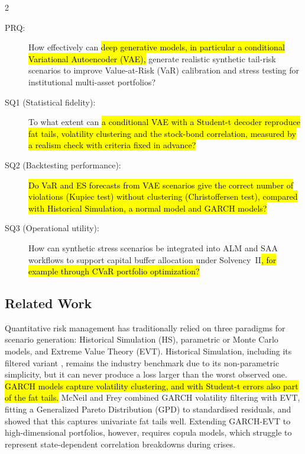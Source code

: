 \documentclass[12pt]{spieman}  %
\newcommand{\new}[1]{\hl{#1}}
\begin{document}
\begin{spacing}{2}
\begin{description}
\item[PRQ:] How effectively can \new{deep generative models, in particular a conditional Variational Autoencoder (VAE),} generate realistic synthetic tail-risk scenarios to improve Value-at-Risk (VaR) calibration and stress testing for institutional multi-asset portfolios?
\item[SQ1 (Statistical fidelity):] To what extent can \new{a conditional VAE with a Student-t decoder reproduce fat tails, volatility clustering and the stock-bond correlation, measured by a realism check with criteria fixed in advance?}
\item[SQ2 (Backtesting performance):] \new{Do VaR and ES forecasts from VAE scenarios give the correct number of violations (Kupiec test) without clustering (Christoffersen test), compared with Historical Simulation, a normal model and GARCH models?}
\item[SQ3 (Operational utility):] How can synthetic stress scenarios be integrated into ALM and SAA workflows to support capital buffer allocation under Solvency~II\new{, for example through CVaR portfolio optimization?}
\end{description}

\subsection{Related Work}
\label{sect:related}

Quantitative risk management has traditionally relied on three paradigms for scenario generation: Historical Simulation (HS), parametric or Monte Carlo models, and Extreme Value Theory (EVT). Historical Simulation, including its filtered variant \cite{BaroneAdesi99}, remains the industry benchmark due to its non-parametric simplicity, but it can never produce a loss larger than the worst observed one. \new{GARCH models \cite{Bollerslev86} capture volatility clustering, and with Student-t errors also part of the fat tails.} McNeil and Frey \cite{McNeilFrey00} combined GARCH volatility filtering with EVT, fitting a Generalized Pareto Distribution (GPD) to standardised residuals, and showed that this captures univariate fat tails well. Extending GARCH-EVT to high-dimensional portfolios, however, requires copula models, which struggle to represent state-dependent correlation breakdowns during crises.


\end{spacing}
\end{document}
